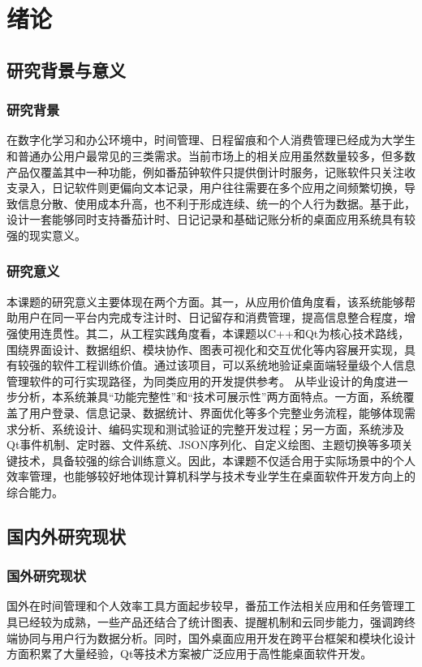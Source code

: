 \chapter{绪论}

\section{研究背景与意义}

\subsection{研究背景}
在数字化学习和办公环境中，时间管理、日程留痕和个人消费管理已经成为大学生和普通办公用户最常见的三类需求。当前市场上的相关应用虽然数量较多，但多数产品仅覆盖其中一种功能，例如番茄钟软件只提供倒计时服务，记账软件只关注收支录入，日记软件则更偏向文本记录，用户往往需要在多个应用之间频繁切换，导致信息分散、使用成本升高，也不利于形成连续、统一的个人行为数据。基于此，设计一套能够同时支持番茄计时、日记记录和基础记账分析的桌面应用系统具有较强的现实意义。

\subsection{研究意义}
本课题的研究意义主要体现在两个方面。其一，从应用价值角度看，该系统能够帮助用户在同一平台内完成专注计时、日记留存和消费管理，提高信息整合程度，增强使用连贯性。其二，从工程实践角度看，本课题以C++和Qt为核心技术路线，围绕界面设计、数据组织、模块协作、图表可视化和交互优化等内容展开实现，具有较强的软件工程训练价值。通过该项目，可以系统地验证桌面端轻量级个人信息管理软件的可行实现路径，为同类应用的开发提供参考。
从毕业设计的角度进一步分析，本系统兼具“功能完整性”和“技术可展示性”两方面特点。一方面，系统覆盖了用户登录、信息记录、数据统计、界面优化等多个完整业务流程，能够体现需求分析、系统设计、编码实现和测试验证的完整开发过程；另一方面，系统涉及Qt事件机制、定时器、文件系统、JSON序列化、自定义绘图、主题切换等多项关键技术，具备较强的综合训练意义。因此，本课题不仅适合用于实际场景中的个人效率管理，也能够较好地体现计算机科学与技术专业学生在桌面软件开发方向上的综合能力。

\section{国内外研究现状}

\subsection{国外研究现状}
国外在时间管理和个人效率工具方面起步较早，番茄工作法相关应用和任务管理工具已经较为成熟，一些产品还结合了统计图表、提醒机制和云同步能力，强调跨终端协同与用户行为数据分析。同时，国外桌面应用开发在跨平台框架和模块化设计方面积累了大量经验，Qt等技术方案被广泛应用于高性能桌面软件开发。

